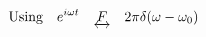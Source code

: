 \documentclass[preview]{standalone}
\begin{document}
\begin{align*}
\textrm{Using}& \quad e^{i\omega t} \quad \underleftrightarrow{F} \quad 2\pi \delta(\omega - \omega_{0}) \\
\end{align*}
\end{document}
